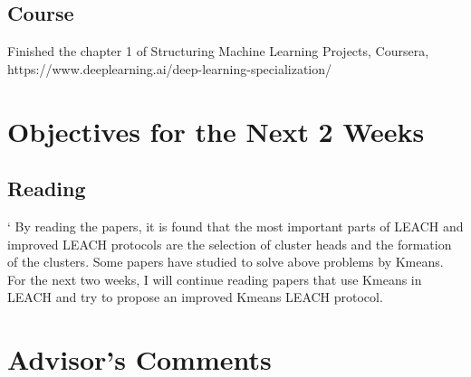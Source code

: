 \documentclass[11pt]{report}
\begin{document}
	
	
	\subsection{Course}
	Finished the chapter 1 of Structuring Machine Learning Projects, Coursera, https://www.deeplearning.ai/deep-learning-specialization/
	
	\section{Objectives for the Next 2 Weeks}
	\subsection{Reading} `													
	By reading the papers, it is found that the most important parts of LEACH and improved LEACH protocols are the selection of cluster heads and the formation of the clusters. Some papers have studied to solve above problems by Kmeans. For the next two weeks, I will continue reading papers that use Kmeans in LEACH and try to propose an improved Kmeans LEACH protocol. 
	
	\section{Advisor's Comments}
	
	
	
	
\end{document}
